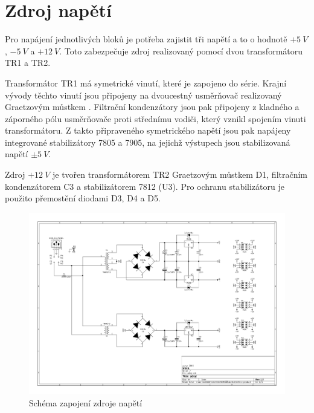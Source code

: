 \section{Zdroj napětí}
\indent\indent Pro napájení jednotlivých bloků je potřeba zajistit tři napětí a to o hodnotě $+5~V$, $-5~V$ a $+12~V$. Toto zabezpečuje zdroj realizovaný pomocí dvou transformátoru  TR1 a TR2.

Transformátor TR1 má symetrické vinutí, které je zapojeno do série. Krajní vývody těchto vinutí jsou připojeny na dvoucestný usměrňovač realizovaný Graetzovým můstkem . Filtrační kondenzátory jsou pak připojeny z kladného a záporného pólu usměrňovače proti střednímu vodiči, který vznikl spojením vinuti transformátoru. Z takto připraveného symetrického napětí jsou pak napájeny integrované stabilizátory 7805 a 7905, na jejichž výstupech jsou stabilizovaná napětí $\pm5~V$.

Zdroj $+12~V$ je tvořen transformátorem TR2 Graetzovým můstkem D1, filtračním kondenzátorem C3 a stabilizátorem 7812 (U3). Pro ochranu stabilizátoru je použito přemostění diodami D3, D4 a D5.

\begin{landscape}
	\begin{figure}[h]
		\centering 	
		\includegraphics[height=\textwidth]{img/zdroj/sch.pdf}
		\caption{Schéma zapojení zdroje napětí}	
	\end{figure}
\end{landscape}
%

